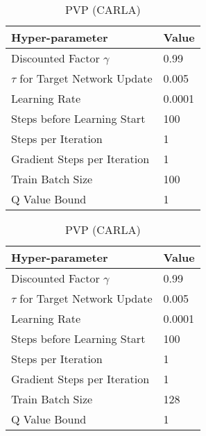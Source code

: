 \begin{table}[H]
\begin{small}
\begin{minipage}{0.45\linewidth}
\centering
\caption{PVP (MetaDrive)}
\begin{tabular}{@{}ll@{}}
\toprule
Hyper-parameter             & Value  \\ \midrule
Discounted Factor $\gamma$   & 0.99  \\
$\tau$ for Target Network Update & 0.005 \\
Learning Rate               & 0.0001 \\ 
Steps before Learning Start & 100\\
Steps per Iteration & 1\\
Gradient Steps per Iteration & 1\\
Train Batch Size & 100  \\
Q Value Bound & 1 \\
\bottomrule
\end{tabular}
\end{minipage}\hfill
\begin{minipage}{0.45\linewidth}
\centering
\caption{PVP (CARLA)}
\begin{tabular}{@{}ll@{}}
\toprule
Hyper-parameter             & Value  \\ \midrule
Discounted Factor $\gamma$   & 0.99  \\
$\tau$ for Target Network Update & 0.005 \\
Learning Rate               & 0.0001 \\ 
Steps before Learning Start & 100\\
Steps per Iteration & 1\\
Gradient Steps per Iteration & 1\\
Train Batch Size & 128  \\
Q Value Bound & 1 \\
\bottomrule
\end{tabular}
\end{minipage}
\end{small}
\end{table}
